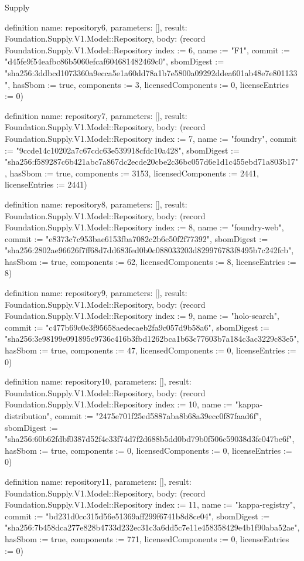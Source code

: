 \begin{lexlean}{Supply}
\begin{semanticmodule}
definition{
  name: repository6,
  parameters: [],
  result: Foundation.Supply.V1.Model::Repository,
  body: (record Foundation.Supply.V1.Model::Repository {index := 6, name := "F1", commit := "d45fe9f54eafbc86b5060efcaf604681482469c0", sbomDigest := "sha256:3ddbcd1073360a9ecca5e1a60dd78a1b7e5800a09292ddea601ab48e7e801133", hasSbom := true, components := 3, licensedComponents := 0, licenseEntries := 0})
}

definition{
  name: repository7,
  parameters: [],
  result: Foundation.Supply.V1.Model::Repository,
  body: (record Foundation.Supply.V1.Model::Repository {index := 7, name := "foundry", commit := "9ccde14c10202a7c67cdc63e539918cfdc10a428", sbomDigest := "sha256:f589287c6b421abc7a867dc2ecde20cbe2c36bc057d6e1d1c455ebd71a803b17", hasSbom := true, components := 3153, licensedComponents := 2441, licenseEntries := 2441})
}

definition{
  name: repository8,
  parameters: [],
  result: Foundation.Supply.V1.Model::Repository,
  body: (record Foundation.Supply.V1.Model::Repository {index := 8, name := "foundry-web", commit := "e8373c7c953bae6153fba7082c2b6c50f2f77392", sbomDigest := "sha256:2802ae96626f7ff68d7dd683fed0b0c088033203d829976783f8495b7c242fcb", hasSbom := true, components := 62, licensedComponents := 8, licenseEntries := 8})
}

definition{
  name: repository9,
  parameters: [],
  result: Foundation.Supply.V1.Model::Repository,
  body: (record Foundation.Supply.V1.Model::Repository {index := 9, name := "holo-search", commit := "c477b69c0e3f95658aedecaeb2fa9c057d9b58a6", sbomDigest := "sha256:3e98199e091895c9736c416b3fbd1262bca1b63c77603b7a184c3ac3229c83e5", hasSbom := true, components := 47, licensedComponents := 0, licenseEntries := 0})
}

definition{
  name: repository10,
  parameters: [],
  result: Foundation.Supply.V1.Model::Repository,
  body: (record Foundation.Supply.V1.Model::Repository {index := 10, name := "kappa-distribution", commit := "2475e701f25ed5887aba8b68a39ecc0f87faad6f", sbomDigest := "sha256:60b62fdbf0387d52f4e33f74d7f2d688b5dd0bd79b0f506c59038d3fc047be6f", hasSbom := true, components := 0, licensedComponents := 0, licenseEntries := 0})
}

definition{
  name: repository11,
  parameters: [],
  result: Foundation.Supply.V1.Model::Repository,
  body: (record Foundation.Supply.V1.Model::Repository {index := 11, name := "kappa-registry", commit := "bd231d0cc315d56e51369aff299f6741b8d8ce04", sbomDigest := "sha256:7b458dca277e828b4733d232ec31c3a6dd5c7e11e458358429e4b1f90aba52ae", hasSbom := true, components := 771, licensedComponents := 0, licenseEntries := 0})
}


\end{semanticmodule}
\end{lexlean}
